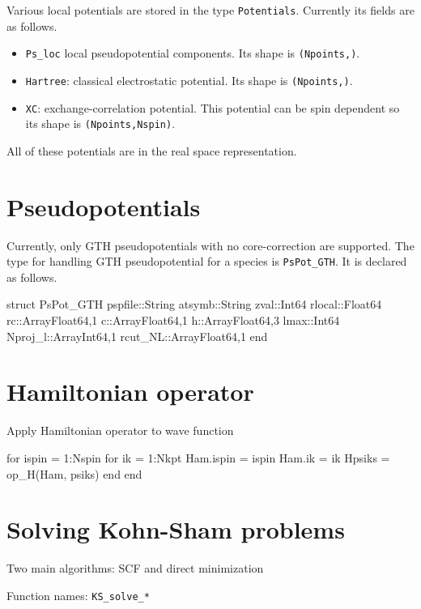 \documentclass[a4paper,10pt]{paper}
\newcommand{\jlcode}[1]{\texttt{#1}}
\begin{document}
Various local potentials are stored in the type \jlcode{Potentials}. Currently
its fields are as follows.
\begin{itemize}
%
\item \jlcode{Ps_loc} local pseudopotential components.
  Its shape is \jlcode{(Npoints,)}.
%
\item \jlcode{Hartree}: classical electrostatic potential.
  Its shape is \jlcode{(Npoints,)}.
%
\item \jlcode{XC}: exchange-correlation potential. This potential can be spin
  dependent so its shape is \jlcode{(Npoints,Nspin)}.
%
\end{itemize}

All of these potentials are in the real space representation.


\section{Pseudopotentials}

Currently, only GTH pseudopotentials with no core-correction are supported.
The type for handling GTH pseudopotential for a species is \jlcode{PsPot_GTH}.
It is declared as follows.

\begin{juliacode}
struct PsPot_GTH
    pspfile::String
    atsymb::String
    zval::Int64
    rlocal::Float64
    rc::Array{Float64,1}
    c::Array{Float64,1}
    h::Array{Float64,3}
    lmax::Int64
    Nproj_l::Array{Int64,1}
    rcut_NL::Array{Float64,1}
end
\end{juliacode}

\section{Hamiltonian operator}

Apply Hamiltonian operator to wave function
\begin{juliacode}
for ispin = 1:Nspin
    for ik = 1:Nkpt
        Ham.ispin = ispin
        Ham.ik = ik
        Hpsiks = op_H(Ham, psiks)
    end
end
\end{juliacode}


\section{Solving Kohn-Sham problems}

Two main algorithms: SCF and direct minimization

Function names: \jlcode{KS_solve_*}
\end{document}
